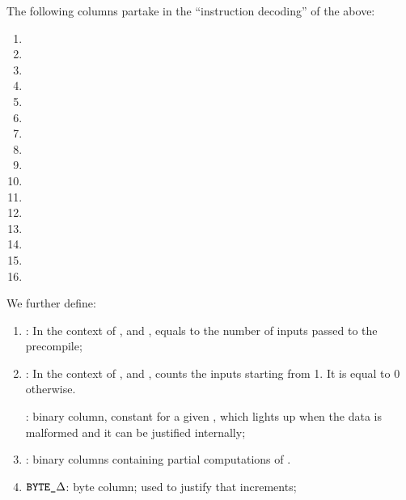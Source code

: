 The following columns partake in the ``instruction decoding'' of the above:
\begin{multicols}{2}
      \begin{enumerate}
        \item \isPointEvaluationData
        \item \isPointEvaluationResult

        \item \isBlsGOneAddData             
        \item \isBlsGOneAddResult           
             
        \item \isBlsGOneMsmData             
        \item \isBlsGOneMsmResult 

        \item \isBlsGTwoAddData             
        \item \isBlsGTwoAddResult   

        \item \isBlsGTwoMsmData
        \item \isBlsGTwoMsmResult

        \item \isBlsPairingCheckData
        \item \isBlsPairingCheckResult          
      
        \item \isBlsMapFpToGOneData         
        \item \isBlsMapFpToGOneResult       
      
        \item \isBlsMapFpTwoToGTwoData         
        \item \isBlsMapFpTwoToGTwoResult
      \end{enumerate}
\end{multicols}

We further define: 

\begin{enumerate}[resume]
  \item \totalInputs:
        In the context of ,  and , equals to the number of inputs passed to the precompile;
  \item \accInputs: In the context of ,  and , counts the inputs starting from 1. It is equal to 0 otherwise.
  

  \both{\malformedDataInternalJustification}:
        binary column, constant for a given \blsId, which lights up when the data is malformed and it can be justified internally;


  \item \both{\partialChecks}:
        binary columns containing partial computations of \malformedDataInternalJustification{}.
  \item $\texttt{BYTE}\texttt{\_$\Delta$}$:
        byte column; used to justify that \blsId{} increments;
\end{enumerate}

